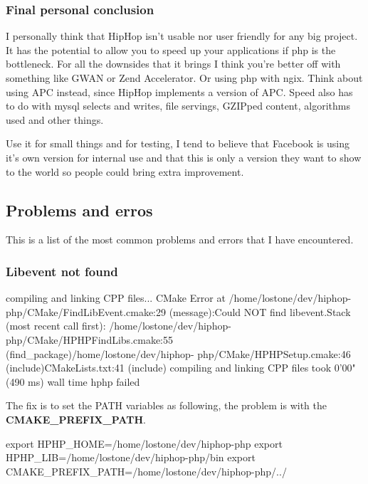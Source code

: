 \subsubsection{Final personal conclusion}
I personally think that HipHop isn't usable nor user friendly for any big project. It has the potential to
allow you to speed up your applications if \gls{php} is the bottleneck. For all the downsides that it brings I think
you're better off with something like GWAN or Zend Accelerator. Or using \gls{php} with ngix. 
Think about using APC instead, since HipHop implements a version of APC.
Speed also has to do with \gls{mysql} selects and writes, file servings, GZIPped content, algorithms used and other things.

Use it for small things and for testing, I tend to believe that Facebook is using it's own version for internal
use and that this is only a version they want to show to the world so people could bring extra
improvement.

\subsection{Problems and erros}
This is a list of the most common problems and errors that I have encountered.
\subsubsection{Libevent not found}
\begin{codelisting}
compiling and linking CPP files...
CMake Error at /home/lostone/dev/hiphop-
php/CMake/FindLibEvent.cmake:29 (message):\n Could NOT find
libevent.\nCall Stack (most recent call first):\n
/home/lostone/dev/hiphop-php/CMake/HPHPFindLibs.cmake:55
(find_package)\n /home/lostone/dev/hiphop-
php/CMake/HPHPSetup.cmake:46 (include)\n CMakeLists.txt:41
(include)\n\n\n
compiling and linking CPP files took 0'00" (490 ms) wall time
hphp failed
\end{codelisting}
The fix is to set the PATH variables as following, the problem is with the \textbf{CMAKE\_PREFIX\_PATH}.
\begin{codelisting}
export HPHP_HOME=/home/lostone/dev/hiphop-php
export HPHP_LIB=/home/lostone/dev/hiphop-php/bin
export CMAKE_PREFIX_PATH=/home/lostone/dev/hiphop-php/../
\end{codelisting}

